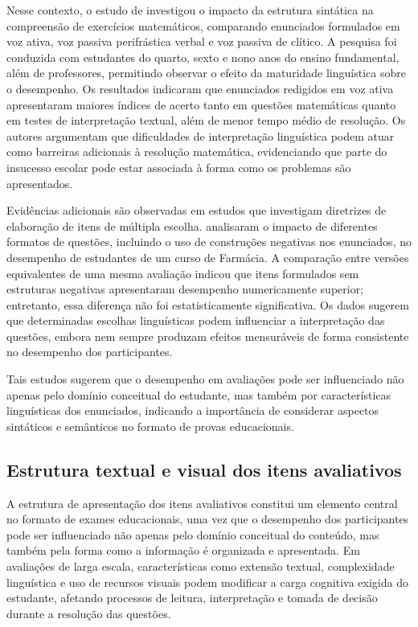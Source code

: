 \documentclass[a4paper,10pt, twocolumn]{article}
\begin{document}
Nesse contexto, o estudo de \textcite{correia2004complexidade} investigou o impacto da estrutura sintática na compreensão de exercícios matemáticos, comparando enunciados formulados em voz ativa, voz passiva perifrástica verbal e voz passiva de clítico. A pesquisa foi conduzida com estudantes do quarto, sexto e nono anos do ensino fundamental, além de professores, permitindo observar o efeito da maturidade linguística sobre o desempenho. Os resultados indicaram que enunciados redigidos em voz ativa apresentaram maiores índices de acerto tanto em questões matemáticas quanto em testes de interpretação textual, além de menor tempo médio de resolução. Os autores argumentam que dificuldades de interpretação linguística podem atuar como barreiras adicionais à resolução matemática, evidenciando que parte do insucesso escolar pode estar associada à forma como os problemas são apresentados.

Evidências adicionais são observadas em estudos que investigam diretrizes de elaboração de itens de múltipla escolha. \textcite{Caldwell2013} analisaram o impacto de diferentes formatos de questões, incluindo o uso de construções negativas nos enunciados, no desempenho de estudantes de um curso de Farmácia. A comparação entre versões equivalentes de uma mesma avaliação indicou que itens formulados sem estruturas negativas apresentaram desempenho numericamente superior; entretanto, essa diferença não foi estatisticamente significativa. Os dados sugerem que determinadas escolhas linguísticas podem influenciar a interpretação das questões, embora nem sempre produzam efeitos mensuráveis de forma consistente no desempenho dos participantes.

Tais estudos sugerem que o desempenho em avaliações pode ser influenciado não apenas pelo domínio conceitual do estudante, mas também por características linguísticas dos enunciados, indicando a importância de considerar aspectos sintáticos e semânticos no formato de provas educacionais.

\subsection{Estrutura textual e visual dos itens avaliativos}

A estrutura de apresentação dos itens avaliativos constitui um elemento central no formato de exames educacionais, uma vez que o desempenho dos participantes pode ser influenciado não apenas pelo domínio conceitual do conteúdo, mas também pela forma como a informação é organizada e apresentada. Em avaliações de larga escala, características como extensão textual, complexidade linguística e uso de recursos visuais podem modificar a carga cognitiva exigida do estudante, afetando processos de leitura, interpretação e tomada de decisão durante a resolução das questões. \cite{Pullishery2020,2018,silva2019desempenho,Cestaro2020,goncalves2014questoes,lopes2015estudo}
\end{document}
